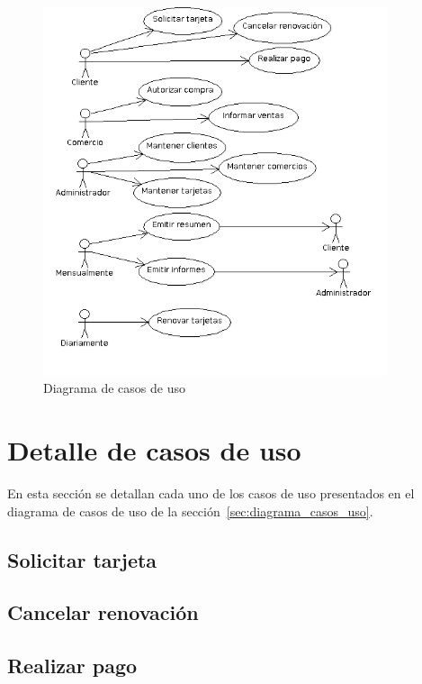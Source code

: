 \begin{figure}[htb]
\begin{center}
\includegraphics[width=0.9\textwidth]{images/mod_casosuso_diagrama.png}
\end{center}
\caption{Diagrama de casos de uso}
\label{fig:modcasosuso:diagramacasos}
\end{figure}

\FloatBarrier

\section{Detalle de casos de uso}

En esta sección se detallan cada uno de los casos de uso presentados en el
diagrama de casos de uso de la sección~\ref{sec:diagrama_casos_uso}.

\subsection{Solicitar tarjeta}


\subsection{Cancelar renovación}


\subsection{Realizar pago}



